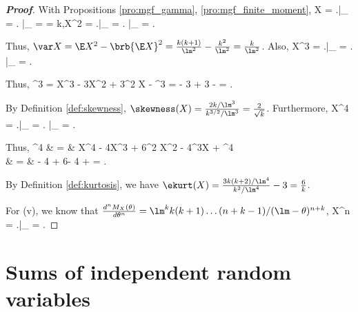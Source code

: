 \begin{proof}[\bf Proof]%
With Propositions \ref{pro:mgf_gamma}, \ref{pro:mgf_finite_moment},
\beast
\E X = \left.\right|_{} = \left. \right|_{} =  = \frac k{\lm},\qquad \E X^2 = \left.\right|_{} = \left.  \right|_{} = .
\eeast

Thus, $\var X = \E X^2 - \brb{\E X}^2 = \frac{k(k+1)}{\lm^2} - \frac{k^2}{\lm^2} = \frac{k}{\lm^2}$. Also,
\be
\E X^3 = \left.\right|_{} = \left.   \right|_{} = .
\ee

Thus,
\be
\E{}^3 = \E X^3 - 3\mu\E X^2 + 3\mu^2 \E X - \mu^3 =   - 3  + 3   -  = .
\ee

By Definition \ref{def:skewness}, $\skewness(X) = \frac{2k/\lm^3}{k^{3/2}/\lm^3} = \frac 2{\sqrt{k}}$. Furthermore,
\be
\E X^4 = \left.\right|_{} = \left.   \right|_{}  = .
\ee

Thus,
\beast
\E{}^4 & = & \E X^4 - 4\mu\E X^3 + 6\mu^2 \E X^2 - 4\mu^3\E X + \mu^4 \\
& = &  - 4 + 6- 4 +  =  .
\eeast

By Definition \ref{def:kurtosis}, we have $\ekurt(X) = \frac{3k(k+2)/\lm^4}{k^2/\lm^4} -3 = \frac 6k$.

For (v), we know that $\frac {d^n M_X(\theta)}{d\theta^n} = \lm^k k(k+1)\dots (n+k-1)/(\lm -\theta)^{n+k}$,
\be
\E X^n = \left.\right|_{} = .
\ee
\end{proof}


\section{Sums of independent random variables}

